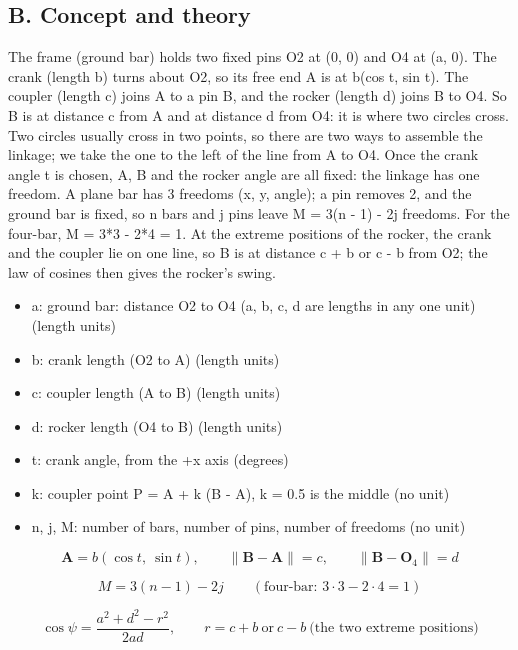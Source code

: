 \documentclass[11pt,a4paper]{article}
\begin{document}
\subsection*{B. Concept and theory}
The frame (ground bar) holds two fixed pins O2 at (0, 0) and O4 at (a, 0). The crank (length b) turns about O2, so its free end A is at b(cos t, sin t). The coupler (length c) joins A to a pin B, and the rocker (length d) joins B to O4. So B is at distance c from A and at distance d from O4: it is where two circles cross. Two circles usually cross in two points, so there are two ways to assemble the linkage; we take the one to the left of the line from A to O4. Once the crank angle t is chosen, A, B and the rocker angle are all fixed: the linkage has one freedom. A plane bar has 3 freedoms (x, y, angle); a pin removes 2, and the ground bar is fixed, so n bars and j pins leave M = 3(n - 1) - 2j freedoms. For the four-bar, M = 3*3 - 2*4 = 1. At the extreme positions of the rocker, the crank and the coupler lie on one line, so B is at distance c + b or c - b from O2; the law of cosines then gives the rocker's swing.

\begin{itemize}[nosep]
\item a: ground bar: distance O2 to O4 (a, b, c, d are lengths in any one unit) (length units)
\item b: crank length (O2 to A) (length units)
\item c: coupler length (A to B) (length units)
\item d: rocker length (O4 to B) (length units)
\item t: crank angle, from the +x axis (degrees)
\item k: coupler point P = A + k (B - A), k = 0.5 is the middle (no unit)
\item n, j, M: number of bars, number of pins, number of freedoms (no unit)
\end{itemize}

\begin{equation*}
\mathbf A=b(\cos t,\ \sin t),\qquad \lVert\mathbf B-\mathbf A\rVert=c,\qquad \lVert\mathbf B-\mathbf O_4\rVert=d
\end{equation*}

\begin{equation*}
M=3(n-1)-2j\qquad(\text{four-bar: }3\cdot 3-2\cdot 4=1)
\end{equation*}

\begin{equation*}
\cos\psi=\frac{a^2+d^2-r^2}{2ad},\qquad r=c+b\ \text{or}\ c-b\ \text{(the two extreme positions)}
\end{equation*}
\end{document}
